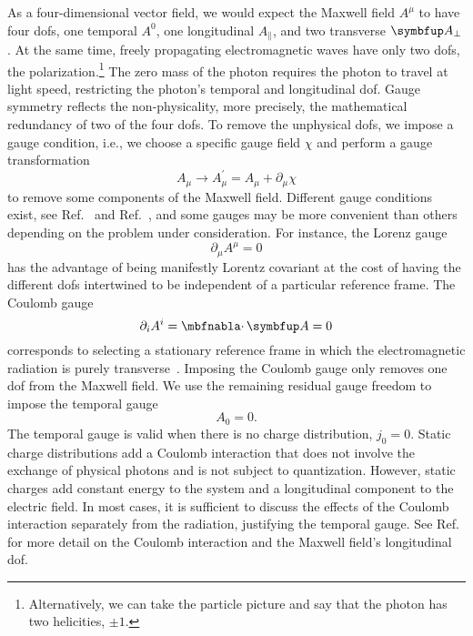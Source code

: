 As a four-dimensional vector field, we would expect the Maxwell field $A^\mu$ to have four \gls{dof}s, one temporal $A^0$, one longitudinal $A_\parallel$, and two transverse $\vb{A}_\perp$.
At the same time, freely propagating electromagnetic waves have only two \gls{dof}s, the polarization.\footnote{Alternatively, we can take the particle picture and say that the photon has two helicities, $\pm1$.}
The zero mass of the photon requires the photon to travel at light speed, restricting the photon's temporal and longitudinal \gls{dof}.
Gauge symmetry reflects the non-physicality, more precisely, the mathematical redundancy of two of the four \gls{dof}s.
To remove the unphysical \gls{dof}s, we impose a gauge condition, i.e., we choose a specific gauge field $\chi$ and perform a gauge transformation
\begin{equation}
	A_\mu
	\to
	A_\mu^\prime
	=
	A_\mu
	+
	\partial_\mu\chi
\end{equation}
to remove some components of the Maxwell field.
Different gauge conditions exist, see Ref.~\cite[p.~144]{Greiner2013} and Ref.~\cite[p.~339]{Srednicki2007}, and some gauges may be more convenient than others depending on the problem under consideration.
For instance, the Lorenz gauge
\begin{equation}
	\partial_\mu
	A^\mu
	=
	0	
\end{equation}
has the advantage of being manifestly Lorentz covariant at the cost of having the different \gls{dof}s intertwined to be independent of a particular reference frame.
The Coulomb gauge
\begin{equation}
	\partial_i
	A^i
	=
	\div\vb{A}
	=
	0
	\label{eq:coulomb_gauge}
\end{equation}
corresponds to selecting a stationary reference frame in which the electromagnetic radiation is purely transverse~\cite[p.~40]{Bogoliubov1982}.
Imposing the Coulomb gauge only removes one \gls{dof} from the Maxwell field.
We use the remaining residual gauge freedom to impose the temporal gauge
\begin{equation}
	A_0
	=
	0
	\label{eq:temporal_gauge}
	.
\end{equation}
The temporal gauge is valid when there is no charge distribution, $j_0=0$.
Static charge distributions add a Coulomb interaction that does not involve the exchange of physical photons and is not subject to quantization.
However, static charges add constant energy to the system and a longitudinal component to the electric field.
In most cases, it is sufficient to discuss the effects of the Coulomb interaction separately from the radiation, justifying the temporal gauge.
See Ref.~\cite[p.~145,187,200]{Greiner2013} for more detail on the Coulomb interaction and the Maxwell field's longitudinal \gls{dof}.

